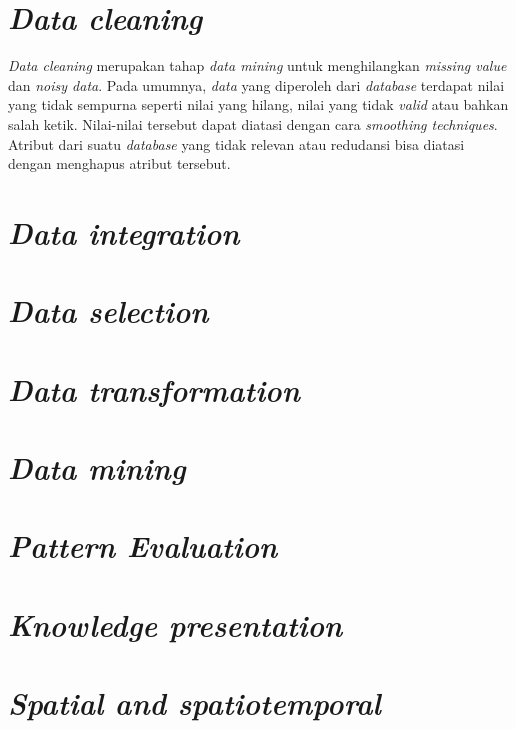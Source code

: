\section{\textsl{Data cleaning}}
\textsl{Data cleaning} merupakan tahap \textsl{data mining} untuk menghilangkan \textsl{missing value} dan \textsl{noisy data}. Pada umumnya, \textsl{data} yang diperoleh dari \textsl{database} terdapat nilai yang tidak sempurna seperti nilai yang hilang, nilai yang tidak \textsl{valid} atau bahkan salah ketik. Nilai-nilai tersebut dapat diatasi dengan cara \textsl{smoothing techniques}. Atribut dari suatu \textsl{database} yang tidak relevan atau redudansi bisa diatasi dengan menghapus atribut tersebut. 

\section{\textsl{Data integration}}


\section{\textsl{Data selection}}
\section{\textsl{Data transformation}}
\section{\textsl{Data mining}}
\section{\textsl{Pattern Evaluation}}
\section{\textsl{Knowledge presentation}}

\section{\textsl{Spatial and spatiotemporal}}